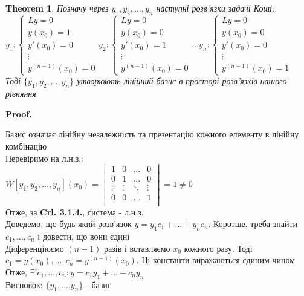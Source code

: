 \documentclass[a4paper, 10pt]{article}
\makeatletter
\def\qed{$\blacksquare$}
\theoremstyle{theoremdd}
\newtheorem{theorem}{Theorem}[subsection]
\theoremstyle{theoremdd}
\theoremstyle{theoremdd}
\theoremstyle{theoremdd}
\theoremstyle{theoremdd}
\theoremstyle{theoremdd}
\theoremstyle{theoremdd}
\theoremstyle{theoremdd}
\renewenvironment{proof}[1][Proof.\\]{\par
\pushQED{\hfill \qed}%
\normalfont \topsep6\p@\@plus6\p@\relax
\trivlist
\item\relax
{\bfseries
#1\@addpunct{.}}\hspace\labelsep\ignorespaces
}{%
\popQED\endtrivlist\@endpefalse
}
\makeatother
\begin{document}
\begin{theorem}
 Позначу через $y_1, y_2, \dots, y_n$ наступні розв'язки задачі Коші:\\
$y_1:
\begin{cases}
 Ly = 0\\
 y(x_0) = 1 \\
 y'(x_0) = 0 \\
 \vdots \\
 y^{(n-1)}(x_0) = 0
\end{cases}
y_2:
\begin{cases}
 Ly = 0\\
 y(x_0) = 0 \\
 y'(x_0) = 1 \\
 \vdots \\
 y^{(n-1)}(x_0) = 0
\end{cases}
\dots
y_n:
\begin{cases}
 Ly = 0\\
 y(x_0) = 0 \\
 y'(x_0) = 0 \\
 \vdots \\
 y^{(n-1)}(x_0) = 1
\end{cases}
$\\
Тоді $\{y_1, y_2, \dots, y_n\}$ утворюють лінійний базис в просторі розв'язків нашого рівняння
\end{theorem}

\begin{proof}
Базис означає лінійну незалежність та презентацію кожного елементу в лінійну комбінацію\\
Перевіримо на л.н.з.:\\
$\displaystyle W[y_1, y_2, \dots, y_n](x_0) = 
\begin{vmatrix} 
	1 &  0 & \dots & 0 \\ 
	0 &  1 & \dots & 0 \\
	\vdots &  \vdots & \ddots & \vdots \\
	0 &  0 & \dots & 1 \\
\end{vmatrix} = 1 \neq 0$\\Отже, за \textbf{Crl. 3.1.4.}, система - л.н.з.
\\
Доведемо, що будь-який розв'язок $y = y_1c_1 + \dots + y_n c_n$. Коротше, треба знайти $c_1, \dots, c_n$ і довести, що вони єдині\\
Диференціюємо $(n-1)$ разів і вставляємо $x_0$ кожного разу. Тоді\\
$c_1 = y(x_0), \dots, c_n=y^{(n-1)}(x_0)$. Ці константи виражаються єдиним чином\\
Отже, $\exists! c_1,\dots,c_n: y = c_1 y_1 + \dots + c_n y_n$\\
Висновок: $\{y_1, \dots. y_n\}$ - базис 
\end{proof}
\end{document}
